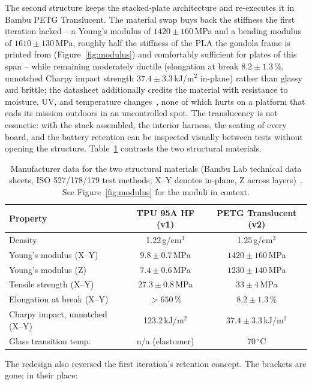 The second structure keeps the stacked-plate architecture and re-executes it
in Bambu PETG Translucent. The material swap buys back the stiffness the
first iteration lacked -- a Young's modulus of $1420 \pm 160$\,MPa and a
bending modulus of $1610 \pm 130$\,MPa, roughly half the stiffness of the
PLA the gondola frame is printed from (Figure~\ref{fig:modulus}) and
comfortably sufficient for plates of this span -- while remaining moderately
ductile (elongation at break $8.2 \pm 1.3$\,\%, unnotched Charpy impact
strength $37.4 \pm 3.3$\,kJ/m$^2$ in-plane) rather than glassy and brittle;
the datasheet additionally credits the material with resistance to moisture,
UV, and temperature changes~\cite{petg}, none of which hurts on a platform
that ends its mission outdoors in an uncontrolled spot. The translucency is
not cosmetic: with the stack assembled, the interior harness, the seating of
every board, and the battery retention can be inspected visually between
tests without opening the structure. Table~\ref{tab:materials} contrasts
the two structural materials.

\begin{table}[H]
  \centering
  \caption{Manufacturer data for the two structural materials (Bambu Lab
  technical data sheets, ISO 527/178/179 test methods; X--Y denotes
  in-plane, Z across layers)~\cite{tpu,petg}. See
  Figure~\ref{fig:modulus} for the moduli in context.}
  \label{tab:materials}
  \begin{tabular}{lcc}
    \toprule
    Property & TPU 95A HF (v1) & PETG Translucent (v2) \\
    \midrule
    Density & 1.22\,g/cm$^3$ & 1.25\,g/cm$^3$ \\
    Young's modulus (X--Y) & $9.8 \pm 0.7$\,MPa & $1420 \pm 160$\,MPa \\
    Young's modulus (Z) & $7.4 \pm 0.6$\,MPa & $1230 \pm 140$\,MPa \\
    Tensile strength (X--Y) & $27.3 \pm 0.8$\,MPa & $33 \pm 4$\,MPa \\
    Elongation at break (X--Y) & $> 650$\,\% & $8.2 \pm 1.3$\,\% \\
    Charpy impact, unnotched (X--Y) & 123.2\,kJ/m$^2$ & $37.4 \pm 3.3$\,kJ/m$^2$ \\
    Glass transition temp. & n/a (elastomer) & 70\,$^\circ$C \\
    \bottomrule
  \end{tabular}
\end{table}

The redesign also reversed the first iteration's retention concept. The
brackets are gone; in their place:

